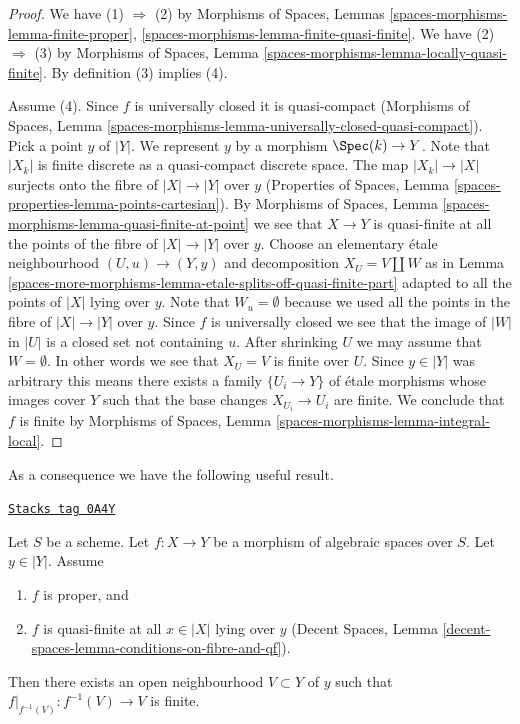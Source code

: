\begin{proof}
We have (1) $\Rightarrow$ (2) by
Morphisms of Spaces, Lemmas \ref{spaces-morphisms-lemma-finite-proper},
\ref{spaces-morphisms-lemma-finite-quasi-finite}.
We have (2) $\Rightarrow$ (3) by
Morphisms of Spaces, Lemma
\ref{spaces-morphisms-lemma-locally-quasi-finite}.
By definition (3) implies (4).

\medskip\noindent
Assume (4). Since $f$ is universally closed it is quasi-compact
(Morphisms of Spaces, Lemma
\ref{spaces-morphisms-lemma-universally-closed-quasi-compact}).
Pick a point $y$ of $|Y|$. We represent $y$ by a
morphism $\Spec(k) \to Y$. Note that $|X_k|$ is finite discrete
as a quasi-compact discrete space. The map $|X_k| \to |X|$ surjects
onto the fibre of $|X| \to |Y|$ over $y$
(Properties of Spaces, Lemma \ref{spaces-properties-lemma-points-cartesian}).
By
Morphisms of Spaces, Lemma \ref{spaces-morphisms-lemma-quasi-finite-at-point}
we see that $X \to Y$ is quasi-finite at all the points of the fibre
of $|X| \to |Y|$ over $y$.
Choose an elementary \'etale neighbourhood $(U, u) \to (Y, y)$
and decomposition $X_U = V \amalg W$ as in
Lemma \ref{spaces-more-morphisms-lemma-etale-splits-off-quasi-finite-part}
adapted to all the points of $|X|$ lying over $y$.
Note that $W_u = \emptyset$ because we used all the points
in the fibre of $|X| \to |Y|$ over $y$.
Since $f$ is universally closed we see that
the image of $|W|$ in $|U|$ is a closed set not containing $u$.
After shrinking $U$ we may assume that $W = \emptyset$.
In other words we see that $X_U = V$ is finite over $U$.
Since $y \in |Y|$ was arbitrary
this means there exists a family $\{U_i \to Y\}$
of \'etale morphisms whose images cover $Y$ such that
the base changes $X_{U_i} \to U_i$ are finite.
We conclude that $f$ is finite by
Morphisms of Spaces, Lemma \ref{spaces-morphisms-lemma-integral-local}.
\end{proof}

As a consequence we have the following useful result.

\begin{lemma}
\label{spaces-more-morphisms-lemma-proper-finite-fibre-finite-in-neighbourhood}
\href{https://stacks.math.columbia.edu/tag/0A4Y}{\texttt{Stacks tag 0A4Y}}

Let $S$ be a scheme. Let $f : X \to Y$ be a morphism of algebraic spaces
over $S$. Let $y \in |Y|$. Assume
\begin{enumerate}
\item $f$ is proper, and
\item $f$ is quasi-finite at all $x \in |X|$ lying over $y$
(Decent Spaces, Lemma \ref{decent-spaces-lemma-conditions-on-fibre-and-qf}).
\end{enumerate}
Then there exists an open neighbourhood $V \subset Y$ of $y$
such that $f|_{f^{-1}(V)} : f^{-1}(V) \to V$ is finite.
\end{lemma}

